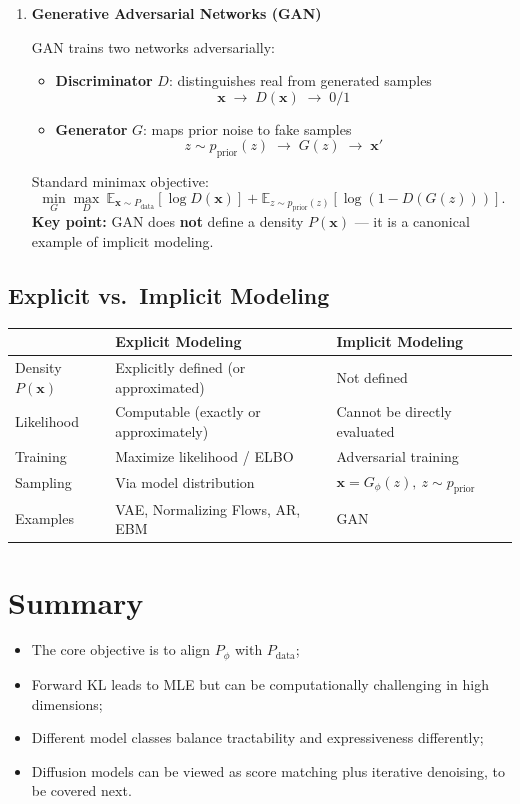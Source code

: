 \documentclass[11pt,a4paper]{article}
\newcommand{\bx}{\mathbf{x}}
\begin{document}
\begin{enumerate}
  \item \textbf{Generative Adversarial Networks (GAN)}

  GAN trains two networks adversarially:
  \begin{itemize}
    \item \textbf{Discriminator} $D$: distinguishes real from generated samples
    \[
    \bx \;\longrightarrow\; D(\bx) \;\longrightarrow\; 0/1
    \]
    \item \textbf{Generator} $G$: maps prior noise to fake samples
    \[
    z\sim p_{\mathrm{prior}}(z) \;\longrightarrow\; G(z) \;\longrightarrow\; \bx'
    \]
  \end{itemize}
  Standard minimax objective:
  \[
  \min_{G}\max_{D}
  \ \mathbb{E}_{\bx\sim P_{\mathrm{data}}}[\log D(\bx)]
  +\mathbb{E}_{z\sim p_{\mathrm{prior}}(z)}[\log(1-D(G(z)))].
  \]
  \textbf{Key point:} GAN does \textbf{not} define a density $P(\bx)$ — it is a canonical example of implicit modeling.

\end{enumerate}

\subsection{Explicit vs.\ Implicit Modeling}

\begin{center}
\renewcommand{\arraystretch}{1.35}
\begin{tabular}{@{}lll@{}}
\toprule
 & \textbf{Explicit Modeling} & \textbf{Implicit Modeling} \\
\midrule
Density $P(\bx)$ & Explicitly defined (or approximated) & Not defined \\
Likelihood & Computable (exactly or approximately) & Cannot be directly evaluated \\
Training & Maximize likelihood / ELBO & Adversarial training \\
Sampling & Via model distribution & $\bx=G_\phi(z),\ z\sim p_\mathrm{prior}$ \\
Examples & VAE, Normalizing Flows, AR, EBM & GAN \\
\bottomrule
\end{tabular}
\end{center}

\section{Summary}
\begin{itemize}
  \item The core objective is to align $P_\phi$ with $P_{\mathrm{data}}$;
  \item Forward KL leads to MLE but can be computationally challenging in high dimensions;
  \item Different model classes balance tractability and expressiveness differently;
  \item Diffusion models can be viewed as score matching plus iterative denoising, to be covered next.
\end{itemize}
\end{document}
